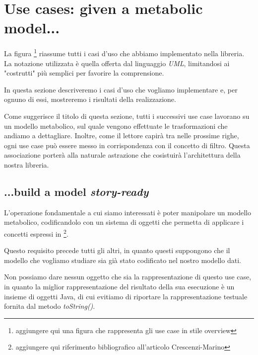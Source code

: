 \section{Use cases: given a metabolic model...}
\label{section:use-cases}

La figura \footnote{aggiungere qui una figura che rappresenta gli use
  case in stile overview} riassume tutti i casi d'uso che abbiamo
implementato nella libreria. La notazione utilizzata \`e quella
offerta dal linguaggio \emph{UML}, limitandosi ai "costrutti" pi\`u
semplici per favorire la comprensione.

In questa sezione descriveremo i casi d'uso che vogliamo implementare
e, per ognuno di essi, mostreremo i risultati della realizzazione.

Come suggerisce il titolo di questa sezione, tutti i successivi use
case lavorano su un modello metabolico, sul quale vengono effettuate
le trasformazioni che andiamo a dettagliare. Inoltre, come il lettore
capir\`a tra nelle prossime righe, ogni use case pu\`o essere messo in
corrispondenza con il concetto di filtro. Questa associazione
porter\`a alla naturale astrazione che cosistuir\`a l'architettura
della nostra libreria.

\subsection{...build a model \emph{story-ready}}
L'operazione fondamentale a cui siamo interessati \`e poter manipolare
un modello metabolico, codificandolo con un sistema di oggetti che
permetta di applicare i concetti espressi in \footnote{aggiungere qui
  riferimento bibliografico all'articolo Crescenzi-Marino}.

Questo requisito precede tutti gli altri, in quanto questi suppongono
che il modello che vogliamo studiare sia gi\`a stato codificato nel
nostro modello dati.

Non possiamo dare nessun oggetto che sia la rappresentazione di questo
use case, in quanto la miglior rappresentazione del risultato della
sua esecuzione \`e un insieme di oggetti Java, di cui evitiamo di
riportare la rappresentazione testuale fornita dal metodo
\emph{toString()}.

